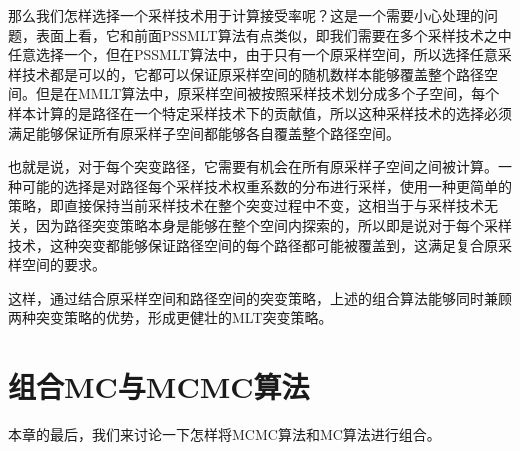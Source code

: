 那么我们怎样选择一个采样技术用于计算接受率呢？这是一个需要小心处理的问题，表面上看，它和前面PSSMLT算法有点类似，即我们需要在多个采样技术之中任意选择一个，但在PSSMLT算法中，由于只有一个原采样空间，所以选择任意采样技术都是可以的，它都可以保证原采样空间的随机数样本能够覆盖整个路径空间。但是在MMLT算法中，原采样空间被按照采样技术划分成多个子空间，每个样本计算的是路径在一个特定采样技术下的贡献值，所以这种采样技术的选择必须满足能够保证所有原采样子空间都能够各自覆盖整个路径空间。

也就是说，对于每个突变路径，它需要有机会在所有原采样子空间之间被计算。一种可能的选择是对路径每个采样技术权重系数的分布进行采样，\cite{a:FusingStateSpacesforMarkovChainMonteCarloRendering}使用一种更简单的策略，即直接保持当前采样技术在整个突变过程中不变，这相当于与采样技术无关，因为路径突变策略本身是能够在整个空间内探索的，所以即是说对于每个采样技术，这种突变都能够保证路径空间的每个路径都可能被覆盖到，这满足复合原采样空间的要求。

这样，通过结合原采样空间和路径空间的突变策略，上述的组合算法能够同时兼顾两种突变策略的优势，形成更健壮的MLT突变策略。












\section{组合MC与MCMC算法}\label{sec:mlt-combine}
本章的最后，我们来讨论一下怎样将MCMC算法和MC算法进行组合。

